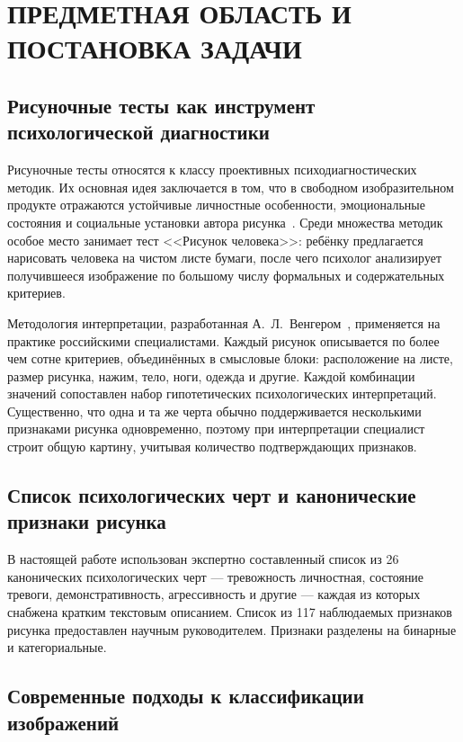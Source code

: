 \section{ПРЕДМЕТНАЯ ОБЛАСТЬ И ПОСТАНОВКА ЗАДАЧИ}

\subsection{Рисуночные тесты как инструмент психологической диагностики}

Рисуночные тесты относятся к классу проективных психодиагностических методик. Их основная идея заключается в том, что в свободном изобразительном продукте отражаются устойчивые личностные особенности, эмоциональные состояния и социальные установки автора рисунка~\cite{venger}. Среди множества методик особое место занимает тест <<Рисунок человека>>: ребёнку предлагается нарисовать человека на чистом листе бумаги, после чего психолог анализирует получившееся изображение по большому числу формальных и содержательных критериев.

Методология интерпретации, разработанная А.~Л.~Венгером~\cite{venger}, применяется на практике российскими специалистами. Каждый рисунок описывается по более чем сотне критериев, объединённых в смысловые блоки: расположение на листе, размер рисунка, нажим, тело, ноги, одежда и другие. Каждой комбинации значений сопоставлен набор гипотетических психологических интерпретаций. Существенно, что одна и та же черта обычно поддерживается несколькими признаками рисунка одновременно, поэтому при интерпретации специалист строит общую картину, учитывая количество подтверждающих признаков.

\subsection{Список психологических черт и канонические признаки рисунка}

В настоящей работе использован экспертно составленный список из 26 канонических психологических черт --- тревожность личностная, состояние тревоги, демонстративность, агрессивность и другие --- каждая из которых снабжена кратким текстовым описанием. Список из 117 наблюдаемых признаков рисунка предоставлен научным руководителем. Признаки разделены на бинарные и категориальные.

\subsection{Современные подходы к классификации изображений}

